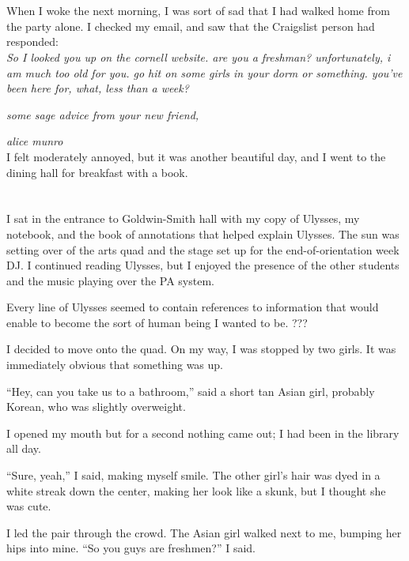 \section{}

When I woke the next morning, I was sort of sad that I had walked home from the
party alone.  I checked my email, and saw that the Craigslist person had
responded: \\

\textit{
So I looked you up on the cornell website. are you a freshman? unfortunately, i
am much too old for you. go hit on some girls in your dorm or something. you've
been here for, what, less than a week?}

\textit{some sage advice from your new friend,}

\textit{alice munro}\\

I felt moderately annoyed, but it was another beautiful day, and I went to the
dining hall for breakfast with a book.

\section{}

I sat in the entrance to Goldwin-Smith hall with my copy of Ulysses, my
notebook, and the book of annotations that helped explain Ulysses.  The sun was
setting over of the arts quad and the stage set up for the end-of-orientation
week DJ. I continued reading Ulysses, but I enjoyed the presence of the other
students and the music playing over the PA system.

Every line of Ulysses seemed to contain references to information that would
enable to become the sort of human being I wanted to be.  ???

I decided to move onto the quad.  On my way, I was stopped by two girls.  It was
immediately obvious that something was up.

``Hey, can you take us to a bathroom,'' said a short tan Asian girl, probably
Korean, who was slightly overweight.

I opened my mouth but for a second nothing came out; I had been in the library
all day.

``Sure, yeah,'' I said, making myself smile.  The other girl's hair was dyed in
a white streak down the center, making her look like a skunk, but I thought  she
was cute.

I led the pair through the crowd.  The Asian girl walked next to me, bumping
her hips into mine. ``So you guys are freshmen?'' I said.  

